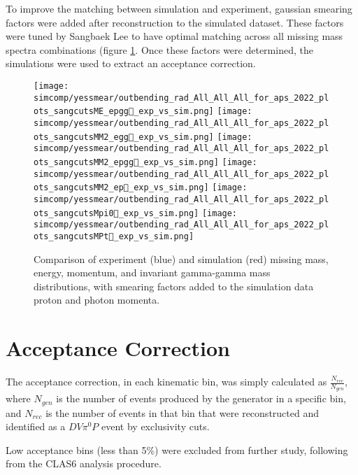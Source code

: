 To improve the matching between simulation and experiment, gaussian smearing factors were added after reconstruction to the simulated dataset. These factors were tuned by Sangbaek Lee to have optimal matching across all missing mass spectra combinations (figure \ref{fig:good}. Once these factors were determined, the simulations were used to extract an acceptance correction.


\begin{figure}[hbt]
	\centering
	\texttt{[image: simcomp/yessmear/outbending\_rad\_All\_All\_All\_for\_aps\_2022\_plots\_sangcutsME\_epgg\_exp\_vs\_sim.png]}
	\texttt{[image: simcomp/yessmear/outbending\_rad\_All\_All\_All\_for\_aps\_2022\_plots\_sangcutsMM2\_egg\_exp\_vs\_sim.png]}
	\texttt{[image: simcomp/yessmear/outbending\_rad\_All\_All\_All\_for\_aps\_2022\_plots\_sangcutsMM2\_epgg\_exp\_vs\_sim.png]}
	\texttt{[image: simcomp/yessmear/outbending\_rad\_All\_All\_All\_for\_aps\_2022\_plots\_sangcutsMM2\_ep\_exp\_vs\_sim.png]}
	\texttt{[image: simcomp/yessmear/outbending\_rad\_All\_All\_All\_for\_aps\_2022\_plots\_sangcutsMpi0\_exp\_vs\_sim.png]}
	\texttt{[image: simcomp/yessmear/outbending\_rad\_All\_All\_All\_for\_aps\_2022\_plots\_sangcutsMPt\_exp\_vs\_sim.png]}
	
	\caption{Comparison of experiment (blue) and simulation (red) missing mass, energy, momentum, and invariant gamma-gamma mass distributions, with smearing factors added to the simulation data proton and photon momenta.}
	\label{fig:good}
\end{figure}


\section{Acceptance Correction}

The acceptance correction, in each kinematic bin, was simply calculated as $\frac{N_{rec}}{N_{gen}}$, where $N_{gen}$ is the number of events produced by the generator in a specific bin, and $N_{rec}$ is the number of events in that bin that were reconstructed and identified as a $DV\pi^0P$ event by exclusivity cuts. 

Low acceptance bins (less than 5\%) were excluded from further study, following from the CLAS6 analysis procedure. 